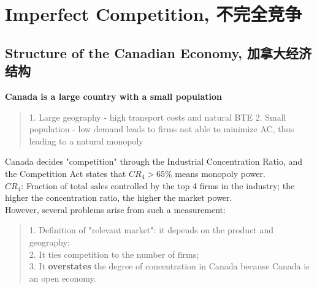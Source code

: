\section{Imperfect Competition, 不完全竞争}

\subsection{Structure of the Canadian Economy, 加拿大经济结构}
\textbf{Canada is a large country with a small population}
\begin{quote}
    1. Large geography - high transport costs and natural BTE
    2. Small population - low demand leads to firms not able to minimize AC, thus leading to a natural monopoly
\end{quote}
Canada decides "competition" through the Industrial Concentration Ratio, and the Competition Act states that $CR_4 > 65\%$ means monopoly power. \\
$CR_4$: Fraction of total sales controlled by the top 4 firms in the industry; the higher the concentration ratio, the higher the market power. \\
However, several problems arise from such a measurement:
\begin{quote}
    1. Definition of "relevant market": it depends on the product and geography; \\
    2. It ties competition to the number of firms; \\
    3. It \textbf{overstates} the degree of concentration in Canada because Canada is an open economy.
\end{quote}

